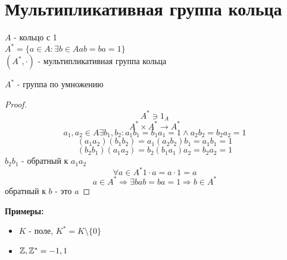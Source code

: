 \section{Мультипликативная группа кольца}

\begin{Def}	 
	$A$ - кольцо с 1\\
	$A^* = \lbrace a \in A: \exists b \in A ab = ba = 1 \rbrace$\\
	$(A^*, \cdot)$ - мультипликативная группа кольца\\
\end{Def}

\begin{theorem}{}
	$A^*$ - группа по умножению\\
\end{theorem}
\begin{proof}
	$$ A^* \ni 1_A $$
	$$ A^* \times A^* \rightarrow A^* $$
	$$ a_1, a_2 \in A \exists b_1, b_2 : a_1b_1 = b_1a_1 = 1 \wedge a_2b_2 = b_2a_2= 1 $$
	$$ (a_1a_2)(b_1b_2) = a_1(a_2b_2)b_1 = a_1b_1 = 1 $$
	$$ (b_2b_1)(a_1a_2) = b_2(b_1a_1)a_2 = b_2a_2 = 1 $$
	$b_2b_1$ - обратный к $a_1a_2$\\
	$$ \forall a \in A^* 1 \cdot a = a \cdot 1 = a $$
	$$ a \in A^* \Rightarrow \exists b ab = ba = 1 \Rightarrow b \in A^*$$
	обратный к $b$ - это $a$ 
\end{proof}
	 
\textbf{ Примеры: }
\begin{itemize}
	\item $K$ - поле, $K^* = K \setminus \lbrace 0 \rbrace$
	\item $\mathbb{Z}, \mathbb{Z}^* = {-1, 1}$
\end{itemize}
